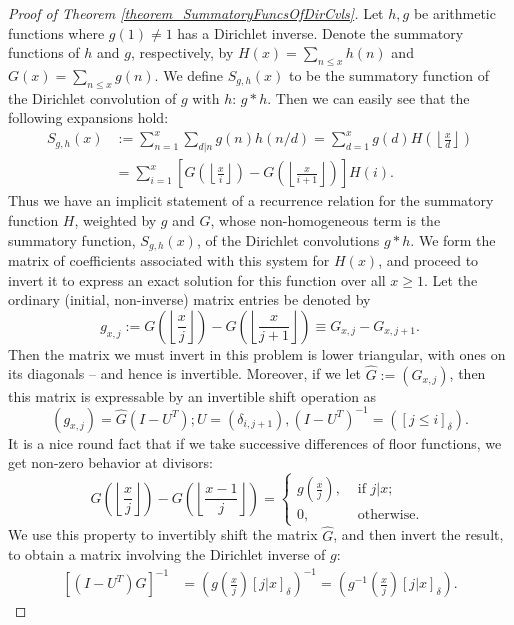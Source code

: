 \documentclass[11pt,reqno,a4letter]{article}
\numberwithin{figure}{section}
\numberwithin{table}{section}
\newcommand{\Iverson}[1]{\ensuremath{\left[#1\right]_{\delta}}}
\newcommand{\floor}[1]{\left\lfloor #1 \right\rfloor}
\theoremstyle{plain}
\numberwithin{theorem}{section}
\theoremstyle{definition}
\begin{document}
\begin{proof}[Proof of Theorem \ref{theorem_SummatoryFuncsOfDirCvls}]
Let $h,g$ be arithmetic functions where $g(1) \neq 1$ has a Dirichlet inverse. Denote the summatory functions of $h$ and $g$, 
respectively, by $H(x) = \sum_{n \leq x} h(n)$ and $G(x) = \sum_{n \leq x} g(n)$. 
We define $S_{g,h}(x)$ to be the summatory function of the Dirichlet convolution of $g$ with $h$: $g \ast h$. 
Then we can easily see that the following expansions hold: 
\begin{align*} 
S_{g,h}(x) & := \sum_{n=1}^{x} \sum_{d|n} g(n) h(n/d) = \sum_{d=1}^x g(d) H\left(\floor{\frac{x}{d}}\right) \\ 
     & = \sum_{i=1}^x \left[G\left(\floor{\frac{x}{i}}\right) - G\left(\floor{\frac{x}{i+1}}\right)\right] H(i). 
\end{align*} 
Thus we have an implicit statement of a recurrence relation for the summatory function $H$, weighted by $g$ and $G$, 
whose non-homogeneous term is the summatory function, $S_{g,h}(x)$, of the Dirichlet convolutions $g \ast h$. 
We form the matrix of coefficients associated with this system for $H(x)$, and proceed to invert it to express an 
exact solution for this function over all $x \geq 1$. Let the ordinary (initial, non-inverse) matrix entries be denoted by 
\[
g_{x,j} := G\left(\floor{\frac{x}{j}}\right) - G\left(\floor{\frac{x}{j+1}}\right) \equiv G_{x,j} - G_{x,j+1}. 
\]
Then the matrix we must invert in this problem is lower triangular, with ones on its diagonals -- and hence is invertible. 
Moreover, if we let $\hat{G} := (G_{x,j})$, then this matrix is expressable by an invertible shift operation as 
\[
(g_{x,j}) = \hat{G} (I - U^{T}); U = (\delta_{i,j+1}), (I - U^T)^{-1} = (\Iverson{j \leq i}). 
\]
It is a nice round fact that if we take successive differences of floor functions, we get non-zero behavior at divisors: 
\[
G\left(\floor{\frac{x}{j}}\right) - G\left(\floor{\frac{x-1}{j}}\right) = 
     \begin{cases} 
     g\left(\frac{x}{j}\right), & \text{ if $j | x$; } \\ 
     0, & \text{ otherwise. } 
     \end{cases}
\]
We use this property to invertibly shift the matrix $\hat{G}$, and then invert the result, to obtain a matrix involving the 
Dirichlet inverse of $g$: 
\begin{align*} 
\left[(I-U^{T}) \hat{G}\right]^{-1} & = \left(g\left(\frac{x}{j}\right) \Iverson{j|x}\right)^{-1} = 
     \left(g^{-1}\left(\frac{x}{j}\right) \Iverson{j|x}\right). 

\end{align*}
\end{proof}
\end{document}
